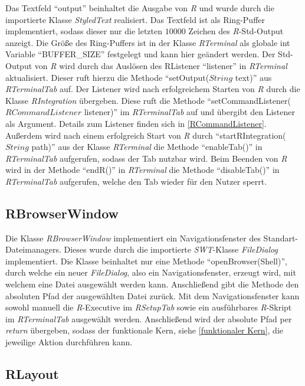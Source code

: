 \documentclass[a4paper, 12pt]{report} %
\begin{document}
Das Textfeld "`output"' beinhaltet die Ausgabe von \textit{R} und wurde durch die importierte Klasse \textit{StyledText} realisiert. Das Textfeld ist als Ring-Puffer implementiert, sodass dieser nur die letzten $10000$ Zeichen des \textit{R}-Std-Output anzeigt. Die Größe des Ring-Puffers ist in der Klasse \textit{RTerminal} als globale int Variable "`BUFFER\_SIZE"' festgelegt und kann hier geändert werden.
Der Std-Output von \textit{R} wird durch das Auslösen des RListener "`listener"' in \textit{RTerminal} aktualisiert. Dieser ruft hierzu die Methode "`setOutput($String$ text)"' aus \textit{RTerminalTab} auf. Der Listener wird nach erfolgreichem Starten von \textit{R} durch die Klasse \textit{RIntegration} übergeben. Diese ruft die Methode "`setCommandListener($RCommandListener$ listener)"' im \textit{RTerminalTab} auf und übergibt den Listener als Argument. Details zum Listener finden sich in \ref{RCommandListener}.\\

Außerdem wird nach einem erfolgreich Start von \textit{R} durch "`startRIntegration($String$ path)"' aus der Klasse \textit{RTerminal}  die Methode "`enableTab()"' in \textit{RTerminalTab} aufgerufen, sodass der Tab nutzbar wird. Beim Beenden von \textit{R} wird in der Methode "`endR()"' in  \textit{RTerminal} die Methode "`disableTab()"' in \textit{RTerminalTab} aufgerufen, welche den Tab wieder für den Nutzer sperrt.

\subsection{RBrowserWindow} \label{RBrowserWindow} 

Die Klasse \textit{RBrowserWindow} implementiert ein Navigationsfenster des Standart-Dateimanagers. 
Dieses wurde durch die importierte \textit{SWT}-Klasse \textit{FileDialog} implementiert. Die Klasse beinhaltet nur eine Methode "`openBrowser(Shell)"', durch welche ein neuer \textit{FileDialog}, also ein Navigationsfenster, erzeugt wird, mit welchem eine Datei ausgewählt werden kann. Anschließend gibt die Methode den absoluten Pfad der ausgewählten Datei zurück. 
Mit dem Navigationsfenster kann sowohl manuell die \textit{R}-Executive im \textit{RSetupTab} sowie ein ausführbares \textit{R}-Skript im \textit{RTerminalTab} ausgewählt werden. Anschließend wird der absolute Pfad per \textit{return} übergeben, sodass der funktionale Kern, siehe \ref{funktionaler Kern}, die jeweilige Aktion durchführen kann.

\subsection{RLayout}
\end{document}
